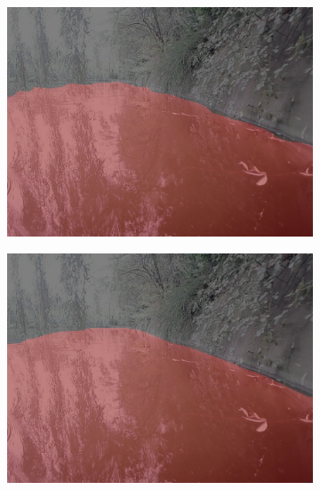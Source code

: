 \documentclass[cn,12pt,color=mine,scheme=chinese,bibstyle=gb7714-2015]{elegantbook}
\begin{document}
\begin{figure}[h]
\begin{subfigure}[b]{0.23\linewidth}
	\end{subfigure}
	\begin{subfigure}[b]{0.23\linewidth}
		\centering\includegraphics[width=\linewidth]{results2/test2setr}
	\end{subfigure}
	\begin{subfigure}[b]{0.23\linewidth}
		\centering\includegraphics[width=\linewidth]{results2/test2segformer}
	\end{subfigure}\\
	\vspace{1mm}
	\begin{subfigure}[b]{0.23\linewidth}

\end{subfigure}
\end{figure}
\end{document}
